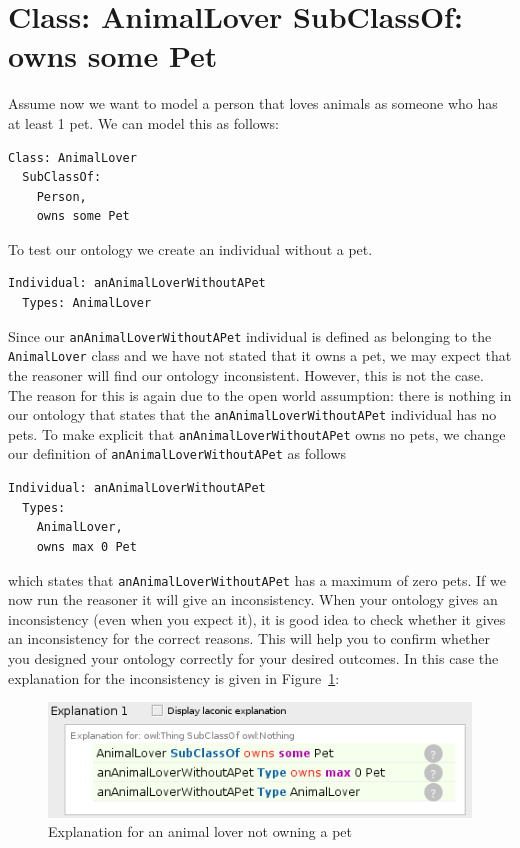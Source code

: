 \documentclass{amsart}
\begin{document}
  \section{Class: AnimalLover SubClassOf: owns some Pet}
  Assume now we want to model a person that loves animals as someone who has at least 1 pet. We can model this as follows:
\begin{small}
\begin{verbatim} 
Class: AnimalLover
  SubClassOf: 
    Person,
    owns some Pet
\end{verbatim}
\end{small}  
To test our ontology we create an individual without a pet.
\begin{small}
\begin{verbatim} 
Individual: anAnimalLoverWithoutAPet
  Types: AnimalLover
\end{verbatim}
\end{small} 
Since our \texttt{anAnimalLoverWithoutAPet} individual is defined as belonging to the \texttt{AnimalLover} class and we have not stated that it owns a pet, we may expect that the reasoner will find our ontology inconsistent. However, this is not the case. The reason for this is again due to the open world assumption: there is nothing in our ontology that states that the \texttt{anAnimalLoverWithoutAPet} individual has no pets. To make explicit that \texttt{anAnimalLoverWithoutAPet} owns no pets, we change our definition of \texttt{anAnimalLoverWithoutAPet} as follows
\begin{small}
\begin{verbatim} 
Individual: anAnimalLoverWithoutAPet
  Types: 
    AnimalLover, 
    owns max 0 Pet
\end{verbatim}
\end{small} 
which states that \texttt{anAnimalLoverWithoutAPet} has a maximum of zero pets. If we now run the reasoner it will give an inconsistency. When your ontology gives an inconsistency (even when you expect it), it is good idea to check whether it gives an inconsistency for the correct reasons. This will help you to confirm whether you designed your ontology correctly for your desired outcomes. In this case the explanation for the inconsistency is given in Figure~\ref{fig_ExplanationAnimalLoverWithoutAPet}:
    \begin{figure}
      \centering \includegraphics[trim = 0mm 0mm 0mm 0mm, clip, scale=0.6]{./ExplanationAnimalLoverWithoutAPet.png}
      \caption{Explanation for an animal lover not owning a pet}\label{fig_ExplanationAnimalLoverWithoutAPet}
    \end{figure} 
\end{document}
